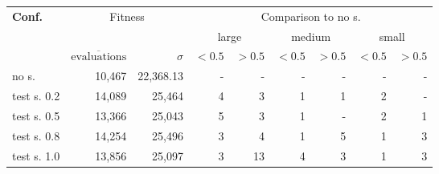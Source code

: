 \begin{tabular}{ l r r | rr | rr | rr }
\hline 
\textbf{Conf.} & \multicolumn{2}{c|}{Fitness} & \multicolumn{6}{c}{Comparison to no s.} \\ 
  &   &   & \multicolumn{2}{c}{large} & \multicolumn{2}{c}{medium} & \multicolumn{2}{c}{small} \\ 
  & $\overline{\text{evaluations}}$ & $\sigma$ & $<0.5$ & $>0.5$ & $<0.5$ & $>0.5$ & $<0.5$ & $>0.5$ \\ 
\hline 
no s. & 10,467 & 22,368.13 & - & - & - & - & - & - \\ 
test s. 0.2 & 14,089 & 25,464& 4& 3& 1& 1& 2& - \\ 
test s. 0.5 & 13,366 & 25,043& 5& 3& 1& -& 2& 1 \\ 
test s. 0.8 & 14,254 & 25,496& 3& 4& 1& 5& 1& 3 \\ 
test s. 1.0 & 13,856 & 25,097& 3& 13& 4& 3& 1& 3 \\ 
\hline 
\end{tabular}